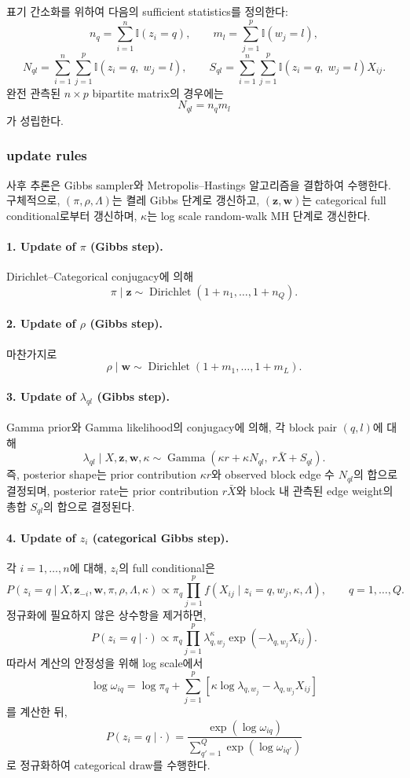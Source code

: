 \documentclass[A4paper,11pt]{article}
\begin{document}
표기 간소화를 위하여 다음의 sufficient statistics를 정의한다:
\[
n_q = \sum_{i=1}^{n}\mathbb{I}(z_i=q),
\qquad
m_l = \sum_{j=1}^{p}\mathbb{I}(w_j=l),
\]
\[
N_{ql}
=
\sum_{i=1}^{n}\sum_{j=1}^{p}\mathbb{I}(z_i=q,\; w_j=l),
\qquad
S_{ql}
=
\sum_{i=1}^{n}\sum_{j=1}^{p}\mathbb{I}(z_i=q,\; w_j=l)X_{ij}.
\]
완전 관측된 $n\times p$ bipartite matrix의 경우에는
\[
N_{ql} = n_q m_l
\]
가 성립한다.

\subsubsection{update rules}

사후 추론은 Gibbs sampler와 Metropolis--Hastings 알고리즘을 결합하여 수행한다. 구체적으로, $(\pi,\rho,\Lambda)$는 켤레 Gibbs 단계로 갱신하고, $(\mathbf{z},\mathbf{w})$는 categorical full conditional로부터 갱신하며, $\kappa$는 log scale random-walk MH 단계로 갱신한다.

\paragraph*{1. Update of $\pi$ (Gibbs step).}
Dirichlet--Categorical conjugacy에 의해
\[
\pi \mid \mathbf{z}
\sim
\operatorname{Dirichlet}(1+n_1,\ldots,1+n_Q).
\]

\paragraph*{2. Update of $\rho$ (Gibbs step).}
마찬가지로
\[
\rho \mid \mathbf{w}
\sim
\operatorname{Dirichlet}(1+m_1,\ldots,1+m_L).
\]

\paragraph*{3. Update of $\lambda_{ql}$ (Gibbs step).}
Gamma prior와 Gamma likelihood의 conjugacy에 의해, 각 block pair $(q,l)$에 대해
\[
\lambda_{ql}\mid X,\mathbf{z},\mathbf{w},\kappa
\sim
\operatorname{Gamma}
\left(
\kappa r + \kappa N_{ql},\;
r\bar X + S_{ql}
\right).
\]
즉, posterior shape는 prior contribution $\kappa r$와 observed block edge 수 $N_{ql}$의 합으로 결정되며, posterior rate는 prior contribution $r\bar X$와 block 내 관측된 edge weight의 총합 $S_{ql}$의 합으로 결정된다.

\paragraph*{4. Update of $z_i$ (categorical Gibbs step).}
각 $i=1,\ldots,n$에 대해, $z_i$의 full conditional은
\[
P(z_i=q \mid X,\mathbf{z}_{-i},\mathbf{w},\pi,\rho,\Lambda,\kappa)
\propto
\pi_q
\prod_{j=1}^{p}
f(X_{ij}\mid z_i=q,w_j,\kappa,\Lambda),
\qquad q=1,\ldots,Q.
\]
정규화에 필요하지 않은 상수항을 제거하면,
\[
P(z_i=q \mid \cdot)
\propto
\pi_q
\prod_{j=1}^{p}
\lambda_{q,w_j}^{\kappa}
\exp(-\lambda_{q,w_j}X_{ij}).
\]
따라서 계산의 안정성을 위해 log scale에서
\[
\log \omega_{iq}
=
\log \pi_q
+
\sum_{j=1}^{p}
\left[
\kappa \log \lambda_{q,w_j}
-
\lambda_{q,w_j}X_{ij}
\right]
\]
를 계산한 뒤,
\[
P(z_i=q\mid \cdot)=\frac{\exp(\log\omega_{iq})}{\sum_{q'=1}^{Q}\exp(\log\omega_{iq'})}
\]
로 정규화하여 categorical draw를 수행한다.
\end{document}
